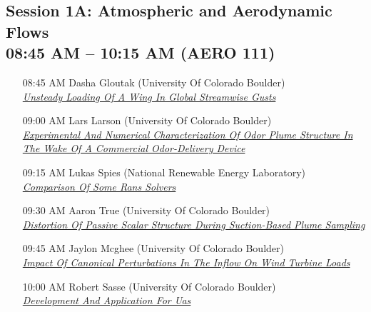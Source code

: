 \subsection*{Session 1A: Atmospheric and Aerodynamic Flows \\ 08:45 AM  -- 10:15 AM (AERO 111)}
\begin{enumerate}
\item [08:45 AM] Dasha Gloutak (University Of Colorado Boulder) \\ \hyperlink{DashaGloutak}{\it Unsteady Loading Of A Wing In Global Streamwise Gusts }
\item [09:00 AM] Lars Larson (University Of Colorado Boulder) \\ \hyperlink{LarsLarson}{\it Experimental And Numerical Characterization Of Odor Plume Structure In The Wake Of A Commercial Odor-Delivery Device }
\item [09:15 AM] Lukas Spies (National Renewable Energy Laboratory) \\ \hyperlink{LukasSpies}{\it Comparison Of Some Rans Solvers }
\item [09:30 AM] Aaron True (University Of Colorado Boulder) \\ \hyperlink{AaronTrue}{\it Distortion Of Passive Scalar Structure During Suction-Based Plume Sampling }
\item [09:45 AM] Jaylon Mcghee (University Of Colorado Boulder) \\ \hyperlink{JaylonMcghee}{\it Impact Of Canonical Perturbations In The Inflow On Wind Turbine Loads }
\item [10:00 AM] Robert Sasse (University Of Colorado Boulder) \\ \hyperlink{RobertSasse}{\it Development And Application For Uas }
\end{enumerate}
